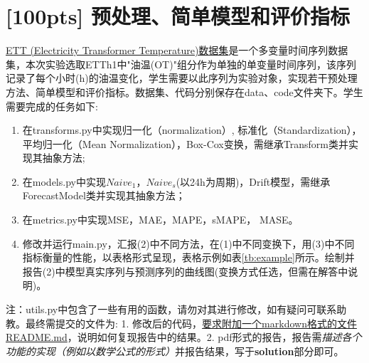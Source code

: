\documentclass[a4paper,UTF8]{article}
\numberwithin{equation}{section}
\begin{document}
	\section{[100pts] 预处理、简单模型和评价指标}
	\href{https://github.com/zhouhaoyi/ETDataset}{ETT (Electricity Transformer Temperature)数据集}是一个多变量时间序列数据集，本次实验选取ETTh1中"油温(OT)"组分作为单独的单变量时间序列，该序列记录了每个小时(h)的油温变化，学生需要以此序列为实验对象，实现若干预处理方法、简单模型和评价指标。数据集、代码分别保存在data、code文件夹下。学生需要完成的任务如下:
	\begin{enumerate}[ {(}1{)}]
		\item 在transforms.py中实现归一化（normalization）, 标准化（Standardization），平均归一化（Mean Normalization），Box-Cox变换，需继承Transform类并实现其抽象方法;
		\item 在models.py中实现$Naive_1$，$Naive_s$(以24h为周期)，Drift模型，需继承ForecastModel类并实现其抽象方法；
		\item 在metrics.py中实现MSE，MAE，MAPE，sMAPE，	MASE。
		\item 修改并运行main.py，汇报(2)中不同方法，在(1)中不同变换下，用(3)中不同指标衡量的性能，以表格形式呈现，表格示例如表\ref{tb:example}所示。绘制并报告(2)中模型真实序列与预测序列的曲线图(变换方式任选，但需在解答中说明)。
	\end{enumerate}
	注：utils.py中包含了一些有用的函数，请勿对其进行修改，如有疑问可联系助教。最终需提交的文件为: 1. 修改后的代码，\underline{要求附加一个markdown格式的文件README.md}，说明如何复现报告中的结果。2. pdf形式的报告，报告需\textit{描述各个功能的实现（例如以数学公式的形式）}并报告结果，写于\textbf{solution}部分即可。
\end{document}
